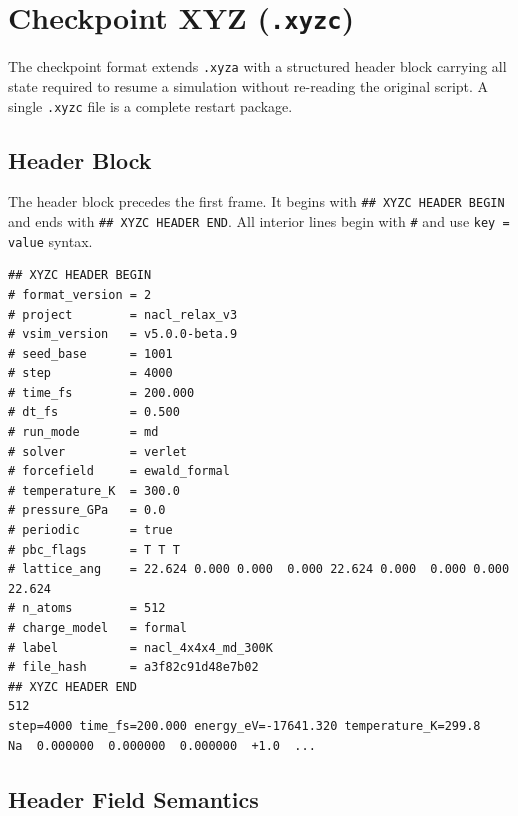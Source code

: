 \documentclass[11pt, a4paper, oneside]{article}
\begin{document}
\section{Checkpoint XYZ (\texttt{.xyzc})}
\label{sec:xyzc}

The checkpoint format extends \texttt{.xyza} with a structured header block
carrying all state required to resume a simulation without re-reading the
original script. A single \texttt{.xyzc} file is a complete restart package.

\subsection{Header Block}
\label{sec:xyzc_header}

The header block precedes the first frame. It begins with
\texttt{\#\# XYZC HEADER BEGIN} and ends with \texttt{\#\# XYZC HEADER END}.
All interior lines begin with \texttt{\#} and use \texttt{key = value} syntax.

\begin{lstlisting}[caption={Checkpoint header block (\texttt{.xyzc}).}]
## XYZC HEADER BEGIN
# format_version = 2
# project        = nacl_relax_v3
# vsim_version   = v5.0.0-beta.9
# seed_base      = 1001
# step           = 4000
# time_fs        = 200.000
# dt_fs          = 0.500
# run_mode       = md
# solver         = verlet
# forcefield     = ewald_formal
# temperature_K  = 300.0
# pressure_GPa   = 0.0
# periodic       = true
# pbc_flags      = T T T
# lattice_ang    = 22.624 0.000 0.000  0.000 22.624 0.000  0.000 0.000 22.624
# n_atoms        = 512
# charge_model   = formal
# label          = nacl_4x4x4_md_300K
# file_hash      = a3f82c91d48e7b02
## XYZC HEADER END
512
step=4000 time_fs=200.000 energy_eV=-17641.320 temperature_K=299.8
Na  0.000000  0.000000  0.000000  +1.0  ...
\end{lstlisting}

\subsection{Header Field Semantics}
\label{sec:xyzc_fields}
\end{document}
